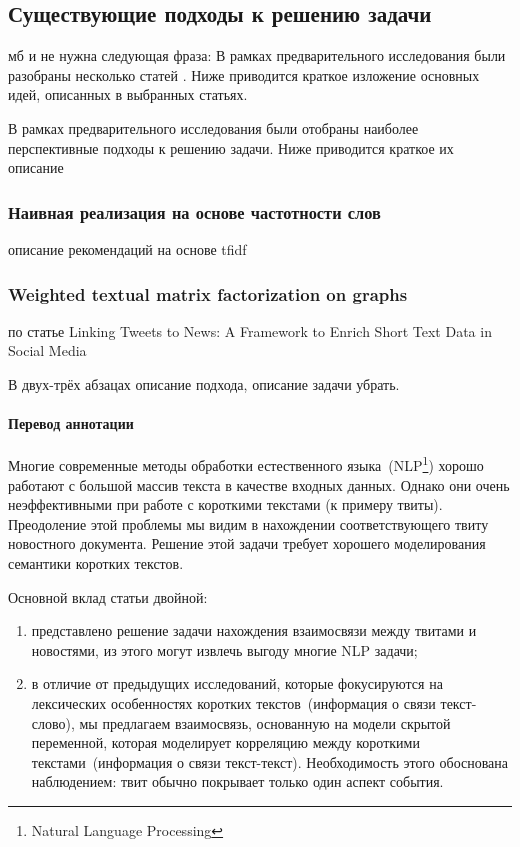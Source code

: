 \subsection{Существующие подходы к решению задачи}
    мб и не нужна следующая фраза:
    В рамках предварительного исследования были разобраны несколько статей \cite{linking_base} \cite{linking_news_media} \cite{bridging}. Ниже приводится краткое изложение основных идей, описанных в выбранных статьях.

    В рамках предварительного исследования были отобраны наиболее перспективные подходы к решению задачи. Ниже приводится краткое их описание

    \subsubsection{Наивная реализация на основе частотности слов}
        описание рекомендаций на основе tfidf

    \subsubsection{Weighted textual matrix factorization on graphs}
        по статье Linking Tweets to News: A Framework to Enrich Short Text Data in Social Media

        В двух-трёх абзацах описание подхода, описание задачи убрать.

        \paragraph{Перевод аннотации}
            Многие современные методы обработки естественного языка~(NLP\footnote{Natural Language Processing}) хорошо работают с большой массив текста в качестве входных данных.
            Однако они очень неэффективными при работе с короткими текстами (к примеру твиты).
            Преодоление этой проблемы мы видим в нахождении соответствующего твиту новостного документа.
            Решение этой задачи требует хорошего моделирования семантики коротких текстов.

            Основной вклад статьи двойной:
            \begin{enumerate}
                \item представлено решение задачи нахождения взаимосвязи между твитами и новостями, из этого могут извлечь выгоду многие NLP задачи;
                \item в отличие от предыдущих исследований, которые фокусируются на лексических особенностях коротких текстов~(информация о связи текст-слово), мы предлагаем взаимосвязь, основанную на модели скрытой переменной, которая моделирует корреляцию между короткими текстами~(информация о связи текст-текст). Необходимость этого обоснована наблюдением: твит обычно покрывает только один аспект события.
            \end{enumerate}

